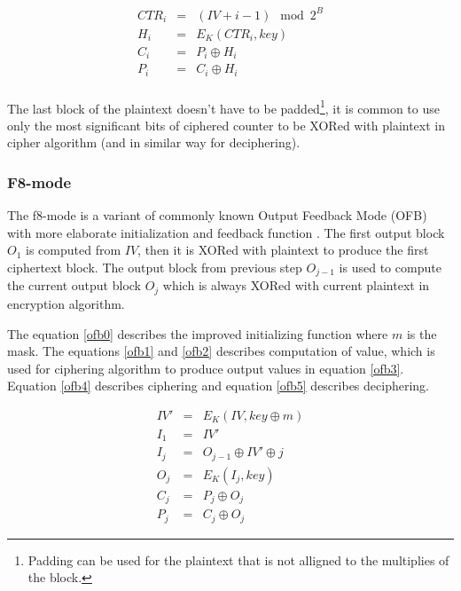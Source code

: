 \begin{eqnarray}
\label{ctr1}
CTR_i &=& (IV + i-1)\mod 2^B \\
\label{ctr2}
H_i &=& E_K(CTR_i, key) \\
\label{ctr3}
C_i &=& P_i \oplus H_i \\
\label{ctr4}
P_i &=& C_i \oplus H_i \\
\end{eqnarray} 

The last block of the plaintext doesn't have to be padded\footnote{ Padding 
can be used for the plaintext that is not alligned to the multiplies of the 
block.}, it is common to use only the most significant bits of ciphered counter
to be XORed with plaintext in cipher algorithm (and in similar way for
deciphering). 


\subsubsection*{F8-mode}
The f8-mode is a variant of commonly known Output Feedback Mode (OFB)
\cite{blockciphers} with more elaborate initialization and feedback function
\cite{rfc3711}. The first output block $O_1$ is computed from $IV$, then it
is XORed with plaintext to produce the first ciphertext block. The output block
from previous step $O_{j-1}$ is used to compute the current output block $O_j$
which is always XORed with current plaintext in encryption algorithm. 

The equation \ref{ofb0} describes the improved initializing function where
$m$ is the mask. The equations \ref{ofb1} and \ref{ofb2} describes computation 
of value, which is used for ciphering algorithm to produce output values in 
equation \ref{ofb3}. Equation \ref{ofb4} describes ciphering and equation 
\ref{ofb5} describes deciphering.

\begin{eqnarray}
\label{ofb0}
IV' &=& E_K(IV, key \oplus m)\\
\label{ofb1}
I_1 &=& IV' \\
\label{ofb2}
I_j &=& O_{j-1} \oplus IV' \oplus j \\
\label{ofb3}
O_j &=& E_K(I_j, key) \\
\label{ofb4}
C_j &=& P_j \oplus O_j \\
\label{ofb5}
P_j &=& C_j \oplus O_j
\label{}
\end{eqnarray}




